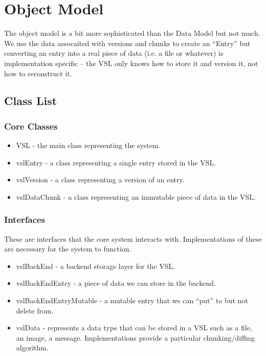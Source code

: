 \documentclass[10pt]{article}
\begin{document}
\section{Object Model}

The object model is a bit more sophisticated than the Data Model but not much.  We use the data assocaited with versions and chunks to create an ``Entry'' but converting an entry into a real piece of data (i.e. a file or whatever) is implementation specific -- the VSL only knows how to store it and version it, not how to reconstruct it.

\subsection{Class List}

\subsubsection{Core Classes}

\begin{itemize}
	\item VSL - the main class representing the system.
	\item vslEntry - a class representing a single entry stored in the VSL.
	\item vslVersion - a class representing a version of an entry.
	\item vslDataChunk - a class representing an immutable piece of data in the
		VSL.
\end{itemize}

\subsubsection{Interfaces}

These are interfaces that the core system interacts with.  Implementations of
these are necessary for the system to function.

\begin{itemize}
	\item vslBackEnd - a backend storage layer for the VSL.
	\item vslBackEndEntry - a piece of data we can store in the backend.  
	\item vslBackEndEntryMutable - a mutable entry that we can ``put'' to but
		not delete from.
	\item vslData - represents a data type that can be stored in a VSL such as a
		file, an image, a message.  Implementations provide a particular
		chunking/diffing algorithm.
\end{itemize}
\end{document}
